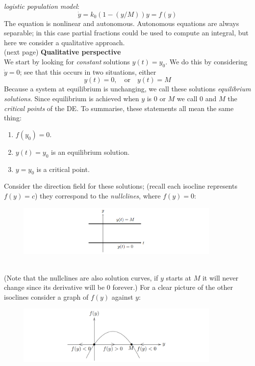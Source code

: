 \documentclass{report}
\begin{document}
\textit{logistic population model}:
\begin{equation*}
\dot{y}=k_0(1-(y/M))y=f(y)
\end{equation*}
The equation is nonlinear and autonomous. 
Autonomous equations are always separable; in this case partial fractions could be used to compute an
integral, but here we consider a qualitative approach.\\
(next page)
\newpage
\noindent\textbf{Qualitative perspective}\\
We start by looking for \textit{constant} solutions
$y(t)=y_0$. We do this by considering $\dot{y}=0$; see that this occurs in two situations, either
\begin{equation*}
y(t)=0,\quad\text{or}\quad y(t)=M
\end{equation*}
Because a system at equilibrium is unchanging, we call these solutions \textit{equilibrium solutions}. 
Since equilibrium is achieved when $y$ is $0$ or $M$ we call $0$ and $M$ the \textit{critical points} of the DE. 
To summarise, these statements all mean the same thing:
\begin{enumerate}
\item $f(y_0)=0$.
\item $y(t)=y_0$ is an equilibrium solution.
\item $y=y_0$ is a critical point.
\end{enumerate}
Consider the direction field for these solutions; (recall each isocline represents $f(y)=c$) they correspond to the
\textit{nullclines}, where $f(y)=0$:
\begin{figure}[h]
\begin{center}
\includegraphics[width=10cm]{14}\\
\end{center}
\end{figure}\\
(Note that the nullclines are also solution curves, if $y$ starts at $M$ it will never change since its
derivative will be 0 forever.) For a clear picture of the other isoclines consider
a graph of $f(y)$ against $y$:
\begin{figure}[h]
\begin{center}
\includegraphics[width=10cm]{15}\\
\end{center}
\end{figure}\\
\end{document}
